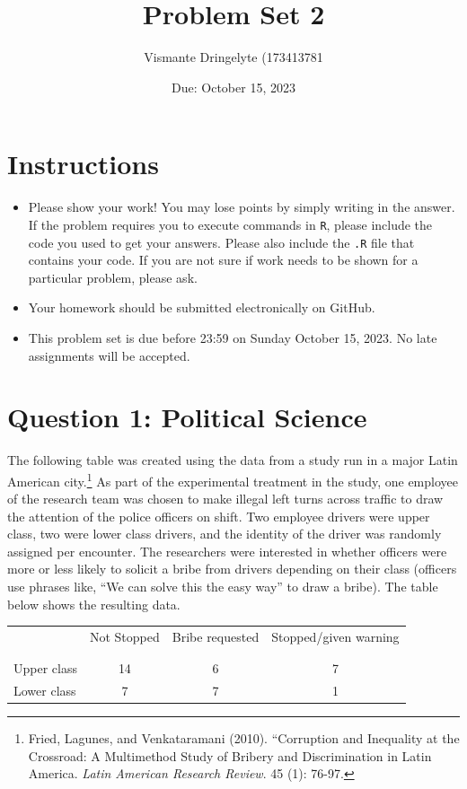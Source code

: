 \documentclass[12pt,letterpaper]{article}
\title{Problem Set 2}
\date{Due: October 15, 2023}
\author{Vismante Dringelyte 
	(173413781}
\begin{document}
	\maketitle
	\section*{Instructions}
\begin{itemize}
	\item Please show your work! You may lose points by simply writing in the answer. If the problem requires you to execute commands in \texttt{R}, please include the code you used to get your answers. Please also include the \texttt{.R} file that contains your code. If you are not sure if work needs to be shown for a particular problem, please ask.
	\item Your homework should be submitted electronically on GitHub.
	\item This problem set is due before 23:59 on Sunday October 15, 2023. No late assignments will be accepted.

\end{itemize}

	
	\vspace{.5cm}
	\section*{Question 1: Political Science}
		\vspace{.25cm}
	The following table was created using the data from a study run in a major Latin American city.\footnote{Fried, Lagunes, and Venkataramani (2010). ``Corruption and Inequality at the Crossroad: A Multimethod Study of Bribery and Discrimination in Latin America. \textit{Latin American Research Review}. 45 (1): 76-97.} As part of the experimental treatment in the study, one employee of the research team was chosen to make illegal left turns across traffic to draw the attention of the police officers on shift. Two employee drivers were upper class, two were lower class drivers, and the identity of the driver was randomly assigned per encounter. The researchers were interested in whether officers were more or less likely to solicit a bribe from drivers depending on their class (officers use phrases like, ``We can solve this the easy way'' to draw a bribe). The table below shows the resulting data.

\newpage
\begin{table}[h!]
	\centering
	\begin{tabular}{l | c c c }
		& Not Stopped & Bribe requested & Stopped/given warning \\
		\\[-1.8ex] 
		\hline \\[-1.8ex]
		Upper class & 14 & 6 & 7 \\
		Lower class & 7 & 7 & 1 \\
		\hline
	\end{tabular}
\end{table}
\end{document}
